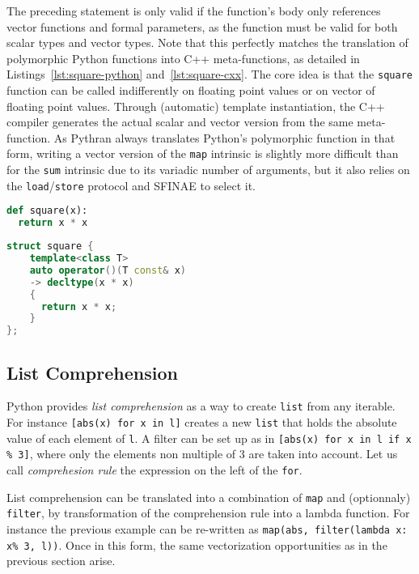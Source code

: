 \documentclass[preprint]{sigplanconf}
\begin{document}
The preceding statement is only valid if the function's body only references
vector functions and formal parameters, as the function must be valid for both
scalar types and vector types. Note that this perfectly matches the translation
of polymorphic Python functions into C++ meta-functions, as detailed in
Listings~\ref{lst:square-python} and~\ref{lst:square-cxx}. The core idea is that
the \texttt{square} function can be called indifferently on floating point
values or on vector of floating point values. Through (automatic) template
instantiation, the C++ compiler generates the actual scalar and vector version
from the same meta-function. As Pythran always translates Python's polymorphic
function in that form, writing a vector version of the \texttt{map} intrinsic is
slightly more difficult than for the \texttt{sum} intrinsic due to its variadic
number of arguments, but it also relies on the \texttt{load}/\texttt{store}
protocol and SFINAE to select it.

\begin{lstlisting}[language=python, label={lst:square-python}, caption={Python implementation of the square function.}]
def square(x):
  return x * x
\end{lstlisting}

\begin{lstlisting}[language=c++, label={lst:square-cxx}, caption={C++ meta-implementation of the square function.}]
struct square {
    template<class T>
    auto operator()(T const& x)
    -> decltype(x * x)
    {
      return x * x;
    }
};
\end{lstlisting}

\subsection{List Comprehension}

Python provides \emph{list comprehension} as a way to create \texttt{list} from
any iterable. For instance \texttt{[abs(x) for x in l]} creates a new
\texttt{list} that holds the absolute value of each element of \texttt{l}. A
filter can be set up as in  \texttt{[abs(x) for x in l if x \% 3]}, where only
the elements non multiple of 3 are taken into account. Let us call
\emph{comprehesion rule} the expression on the left of the
\texttt{for}.

List comprehension can be translated into a combination of \texttt{map} and
(optionnaly) \texttt{filter}, by transformation of the comprehension rule into
a lambda function. For instance the previous example can be re-written as
\texttt{map(abs, filter(lambda x: x\% 3, l))}. Once in this form, the same
    vectorization opportunities as in the previous section arise.
\end{document}
